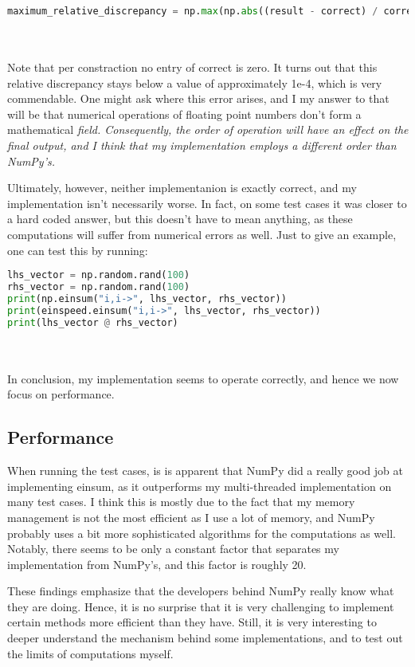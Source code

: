\documentclass[sigconf]{acmart}
\renewcommand{\texttt}[1]{\begingroup\ttfamily\sloppy\hbadness=10000 #1\endgroup}
\begin{document}
\begin{lstlisting}[language=Python]
maximum_relative_discrepancy = np.max(np.abs((result - correct) / correct))
\end{lstlisting}
\\\\
Note that per constraction no entry of \texttt{correct} is zero.
It turns out that this relative discrepancy stays below a value of approximately \texttt{1e-4}, which is very commendable. One might ask where this error arises, and I my answer to that will be that numerical operations of floating point numbers don't form a mathematical \em field\em . Consequently, the order of operation will have an effect on the final output, and I think that my implementation employs a different order than NumPy's.

Ultimately, however, neither implementanion is exactly correct, and my implementation isn't necessarily worse. In fact, on some test cases it was closer to a hard coded answer, but this doesn't have to mean anything, as these computations will suffer from numerical errors as well. Just to give an example, one can test this by running:

\begin{lstlisting}[language=Python]
lhs_vector = np.random.rand(100)
rhs_vector = np.random.rand(100)
print(np.einsum("i,i->", lhs_vector, rhs_vector))
print(einspeed.einsum("i,i->", lhs_vector, rhs_vector))
print(lhs_vector @ rhs_vector)
\end{lstlisting}
\\\\
In conclusion, my implementation seems to operate correctly, and hence we now focus on performance.


\subsection{Performance}
When running the test cases, is is apparent that NumPy did a really good job at implementing einsum, as it outperforms my multi-threaded implementation on many test cases. I think this is mostly due to the fact that my memory management is not the most efficient as I use a lot of memory, and NumPy probably uses a bit more sophisticated algorithms for the computations as well. Notably, there seems to be only a constant factor that separates my implementation from NumPy's, and this factor is roughly 20.

These findings emphasize that the developers behind NumPy really know what they are doing. Hence, it is no surprise that it is very challenging to implement certain methods more efficient than they have. Still, it is very interesting to deeper understand the mechanism behind some implementations, and to test out the limits of computations myself.
\end{document}
